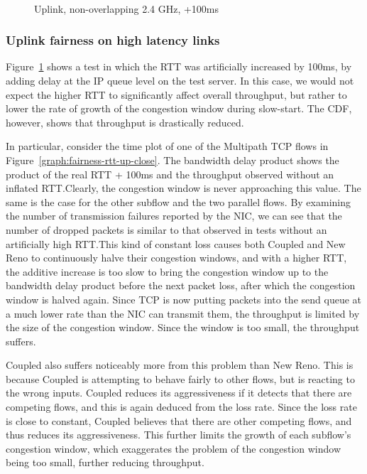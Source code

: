 \begin{figure}[h]
 \centering
 \subfloat[][CDF] {\
   \label{graph:fairness-rtt-up-cdf}
 }
 \\
 \subfloat[][Multipath TCP time plot] {\
   \label{graph:fairness-rtt-up-close}
 }
 \caption{Uplink, non-overlapping 2.4 GHz, +100ms}\label{graph:fairness-rtt-up}
\end{figure}

\subsubsection{Uplink fairness on high latency links}

Figure~\ref{graph:fairness-rtt-up} shows a test in which the RTT was
artificially increased by 100ms, by adding delay at the IP queue level on the
test server. In this case, we would not expect the higher RTT to significantly
affect overall throughput, but rather to lower the rate of growth of the
congestion window during slow-start. The CDF, however, shows that throughput is
drastically reduced.

In particular, consider the time plot of one of the Multipath
TCP flows in Figure~\ref{graph:fairness-rtt-up-close}. The bandwidth delay product shows
the product of the real RTT + 100ms and the throughput observed without an
inflated RTT.\@ Clearly, the congestion window is never approaching this value.
The same is the case for the other subflow and the two parallel flows. By
examining the number of transmission failures reported by the NIC, we can see
that the number of dropped packets is similar to that observed in tests
without an artificially high RTT.\@ This kind of constant loss causes both Coupled
and New Reno to continuously halve their congestion windows, and with a higher
RTT, the additive increase is too slow to bring the congestion window up to the
bandwidth delay product before the next packet loss, after which the congestion 
window is halved again. Since TCP is now putting packets into the send queue at a
much lower rate than the NIC can transmit them, the throughput is limited by the 
size of the congestion window. Since the window is too small, the throughput suffers.

Coupled also suffers noticeably more from this problem than New Reno. This is
because Coupled is attempting to behave fairly to other flows, but is reacting to
the wrong inputs.  Coupled reduces its aggressiveness if it detects that there
are competing flows, and this is again deduced from the loss rate. Since the
loss rate is close to constant, Coupled believes that there are other competing
flows, and thus reduces its aggressiveness. This further limits the growth of
each subflow's congestion window, which exaggerates the problem of the
congestion window being too small, further reducing throughput.


